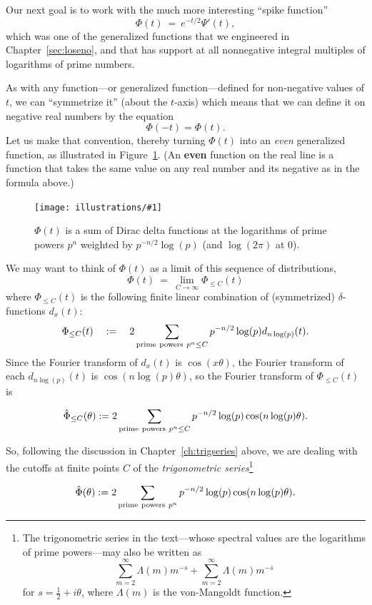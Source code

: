 \documentclass[openany]{book}
\newcommand{\ill}[3]{%
   \begin{figure}[H]%
   \vspace{-2ex}
   \centering%
   \texttt{[image: illustrations/\#1]}%
   \caption{#3}%
   \vspace{-2ex}
    \end{figure}}
\theoremstyle{plain}
\theoremstyle{definition}
\begin{document}
{Our next goal is to work with the much more interesting ``spike
function'' $$\Phi(t) \ = \ e^{- t/2}\Psi'(t),$$ which was one of the
generalized functions that we engineered in Chapter~\ref{sec:loseno},
and that has support at all nonnegative integral multiples of
logarithms of prime numbers.




As with any function---or generalized function---defined for
non-negative values of $t$, we can ``symmetrize it'' (about the
$t$-axis) which means that we can define it on negative real numbers
by the equation
  $$\Phi(-t) = \Phi(t).$$
  Let us make that convention, thereby turning $\Phi(t)$ into an {\it
    even} generalized function, as illustrated in Figure~\ref{fig:bigPhi}. (An {\bf even} function on the real line is a function that takes the same value on any real number and its negative as in the formula above.)

\ill{bigPhi}{1}{$\Phi(t)$ is a sum of Dirac delta functions at the logarithms of prime powers $p^n$ weighted by $p^{-n/2}\log(p)$ (and $\log(2\pi)$ at $0$).\label{fig:bigPhi}}


We may want to think of $\Phi(t)$ as a limit of this sequence of distributions,
 $$\Phi(t)\ = \ \lim_{C \to {\infty}}\Phi_{\le C}(t)$$
where $\Phi_{\le C}(t)$  is the following finite linear
combination of (symmetrized) $\delta$-functions  $d_x(t)$:
 $$\Phi_{\le C}(t)\quad :=\quad  2\sum_{{\rm prime\ powers \ }p^n  \le C} p^{-n/2}\log(p)d_{n\log(p)}(t).$$
 Since the Fourier transform of $d_x(t)$ is  $\cos(x\theta)$, the Fourier transform of  each $d_{n\log(p)}(t)$ is
 $\cos(n\log(p)\theta)$, so the Fourier transform of
 $\Phi_{\le C}(t)$ is

  $${\hat \Phi}_{\leq C}(\theta):= 2\sum_{{\rm prime\ powers\ }p^n  \leq{} C} p^{-n/2} \log(p)\cos(n\log(p)\theta).$$

   So, following the discussion in Chapter~\ref{ch:trigseries} above, we are dealing with the cutoffs at finite points  $C$  of the {\it trigonometric series}{\footnote{The trigonometric series in the text---whose spectral values are the logarithms of prime powers---may also be written as
   $$\sum_{m=2}^{\infty}\Lambda(m)m^{-s} + \sum_{m=2}^{\infty}\Lambda(m)m^{-{\bar s}}$$ for $s={\frac{1}{2}}+i\theta$, where  $\Lambda(m)$ is the von-Mangoldt function.}}

   $${\hat \Phi}(\theta):= 2\sum_{{\rm prime\ powers\ }p^n } p^{-n/2} \log(p)\cos(n\log(p)\theta).$$




}
\end{document}
